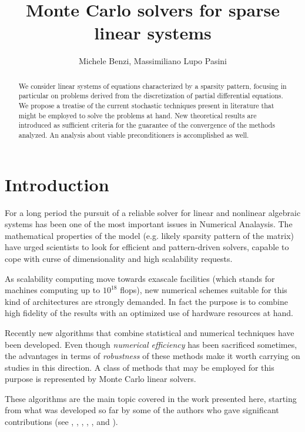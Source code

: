 \documentclass[a4paper,10pt]{article}
\title{Monte Carlo solvers for sparse linear systems}
\author{Michele Benzi, Massimiliano Lupo Pasini}
\date{}
\begin{document}
\maketitle

\begin{abstract}
We consider linear systems of equations characterized by a sparsity pattern,
focusing in particular on problems derived from the discretization of partial
differential equations. We propose a treatise of the current stochastic
techniques present in literature that might be employed to solve the problems at
hand. New theoretical results are introduced as sufficient criteria for the
guarantee of the convergence of the methods analyzed. An analysis about viable
preconditioners is accomplished as well.
\end{abstract}

\section{Introduction}
For a long period the
pursuit of a reliable solver for linear and nonlinear algebraic systems has
been one of the most important issues in Numerical Analaysis. The
mathematical properties of the model (e.g. likely sparsity pattern of the
matrix) have urged scientists to look for efficient and pattern-driven
solvers, capable to cope with curse of dimensionality and high scalability
requests.

As scalability computing move towards exascale facilities (which stands for
machines computing up to $10^{18}$ flops), new numerical schemes suitable for
this
kind of architectures are strongly demanded. In fact the purpose is to combine
high
fidelity of the results with an optimized use of hardware resources at hand.

Recently new algorithms that combine statistical and numerical techniques have
been developed. Even though \textit{numerical efficiency} has been sacrificed
sometimes, the advantages in terms of \textit{robustness} of these methods make
it worth carrying on studies in this direction.
A class of methods that may be employed for this purpose is represented by
Monte Carlo linear solvers.

These algorithms are the main topic covered in the work presented here,
starting from what was developed so far by some of
the authors who gave significant contributions (see \cite{Hal1962},
\cite{Hal1994},
\cite{DA1998}, \cite{DVA2001}, \cite{AADBTW2005},\cite{ESW2013} and
\cite{EMSH2014}). \newline
\end{document}
